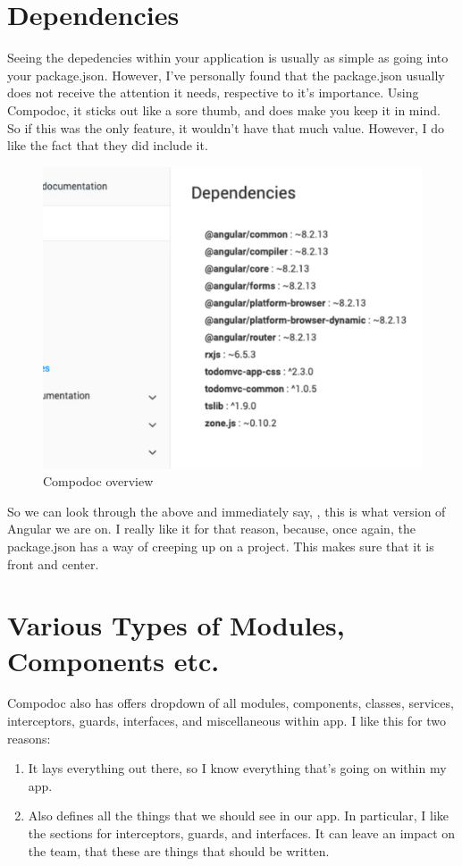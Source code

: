 \section{Dependencies}
Seeing the depedencies within your application is usually as simple as going into your package.json. However, I've personally found that the package.json usually does not receive the attention it needs, respective to it's importance.
Using Compodoc, it sticks out like a sore thumb, and does make you keep it in mind. So if this was the only feature, it wouldn't have that much value. However, I do like the fact that they did include it. 
\begin{figure}[!ht]
\caption{Compodoc overview}
\includegraphics[width=414pt]{graphics/compodoc/dependencies/compo-dependencies-screenshot.pdf}
\end{figure}

So we can look through the above and immediately say, , this is what version of Angular we are on. I really like it for that reason, because, once again, the package.json has a way of creeping up on a project. This makes sure that it is front and center. 

\section{Various Types of Modules, Components etc.}
Compodoc also has offers dropdown of all modules, components, classes, services, interceptors, guards, interfaces, and miscellaneous within app. I like this for two reasons: 
\begin{enumerate}
  \item It lays everything out there, so I know everything that's going on within my app.
  \item Also defines all the things that we should see in our app. In particular, I like the sections for interceptors, guards, and interfaces. It can leave an impact on the team, that these are things that should be written.
\end{enumerate}

